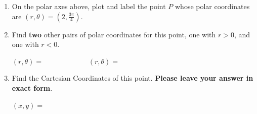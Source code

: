 \begin{enumerate}

\item On the polar axes above, plot and label the point \(P\) whose polar coordinates are \((r,\theta)=(2, \tfrac{3\pi}{4})\).

\vspace*{.1in}

\item  Find \textbf{two} other pairs of polar coordinates for this point, one with \(r>0\), and one with \(r<0\).

\vspace*{.2in}

\underline{\((r,\theta) = \qquad \qquad \qquad\)} \hfill \underline{\((r,\theta) = \qquad \qquad \qquad\)}

\vspace*{.1in}


\item   Find the Cartesian Coordinates of this point. \textbf{Please leave your answer in \textbf{exact form}}.

\vspace*{.2in}

\underline{\((x,y) = \qquad \qquad \qquad \qquad \qquad \qquad\)}

\end{enumerate}

\pagebreak

%


